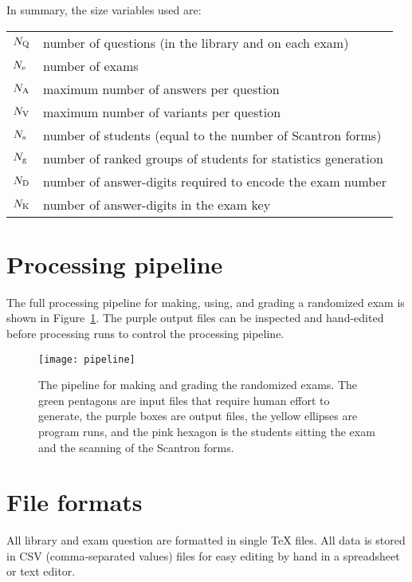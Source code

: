 \documentclass{article}
\begin{document}
In summary, the size variables used are:
\begin{center}
  \begin{tabular}{ll}
    $N_{\rm Q}$ & number of questions (in the library and on each exam) \\
    $N_{\rm e}$ & number of exams \\
    $N_{\rm A}$ & maximum number of answers per question \\
    $N_{\rm V}$ & maximum number of variants per question \\
    $N_{\rm s}$ & number of students (equal to the number of Scantron forms) \\
    $N_{\rm g}$ & number of ranked groups of students for statistics generation \\
    $N_{\rm D}$ & number of answer-digits required to encode the exam number \\
    $N_{\rm K}$ & number of answer-digits in the exam key
  \end{tabular}
\end{center}

\section{Processing pipeline}

The full processing pipeline for making, using, and grading a
randomized exam is shown in Figure~\ref{fig:pipeline}. The purple
output files can be inspected and hand-edited before processing runs
to control the processing pipeline.

\begin{figure}
  \centering
  \texttt{[image: pipeline]}
  \caption{The pipeline for making and grading the randomized
    exams. The green pentagons are input files that require human
    effort to generate, the purple boxes are output files, the yellow
    ellipses are program runs, and the pink hexagon is the students
    sitting the exam and the scanning of the Scantron forms.}
  \label{fig:pipeline}
\end{figure}

\section{File formats}

All library and exam question are formatted in single TeX files. All
data is stored in CSV (comma-separated values) files for easy editing
by hand in a spreadsheet or text editor.
\end{document}
